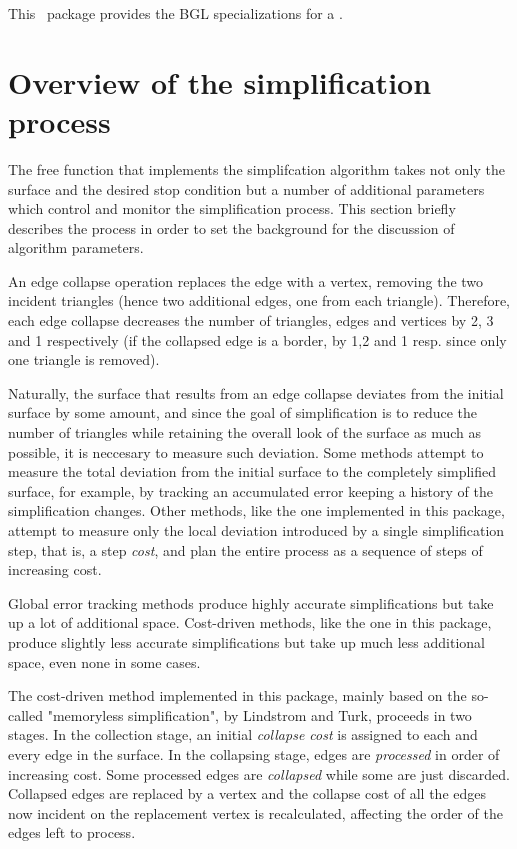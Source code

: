 This \cgal\ package provides the BGL specializations for a .

\section{Overview of the simplification process}

The free function that implements the simplifcation algorithm takes not only the surface and the desired stop condition but a number of additional parameters which control and monitor the simplification process. This section briefly describes the process in order to set the background for the discussion of algorithm parameters.

An edge collapse operation replaces the edge with a vertex, removing the two incident triangles (hence two additional edges, one from each triangle). Therefore, each edge collapse decreases the number of triangles, edges and vertices by 2, 3 and 1 respectively (if the collapsed edge is a border, by 1,2 and 1 resp. since only one triangle is removed).

Naturally, the surface that results from an edge collapse deviates from the initial surface by some amount, and since the goal of simplification is to reduce the number of triangles while retaining the overall look of the surface as much as possible, it is neccesary to measure such deviation. Some methods attempt to measure the total deviation from the initial surface to the completely simplified surface, for example, by tracking an accumulated error keeping a history of the simplification changes. Other methods, like the one implemented in this package, attempt to measure only the local deviation introduced by a single simplification step, that is, a step {\em cost}, and plan the entire process as a sequence of steps of increasing cost. 

Global error tracking methods produce highly accurate simplifications but take up a lot of additional space. Cost-driven methods, like the one in this package, produce slightly less accurate simplifications but take up much less additional space, even none in some cases.

The cost-driven method implemented in this package, mainly based on the so-called "memoryless simplification", by Lindstrom and Turk, proceeds in two stages. In the collection stage, an initial {\em collapse cost} is assigned to each and every edge in the surface. In the collapsing stage, edges are {\em processed} in order of increasing cost. Some processed edges are {\em collapsed} while some are just discarded. Collapsed edges are replaced by a vertex and the collapse cost of all the edges now incident on the replacement vertex is recalculated, affecting the order of the edges left to process.

